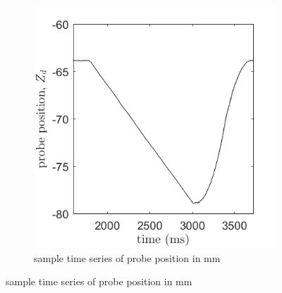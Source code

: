 
\begin{figure}[!ht]
	
	\centering
	
	\begin{subfigure}{.95\textwidth}
		\centering
		\includegraphics[]{./chapter-ftml/plots/timeseries-zplot}  
		\caption{sample time series of probe position in mm}
		\label{ftml-conf:fig:timeseries-zplot}
	\end{subfigure}
	

\end{figure}
